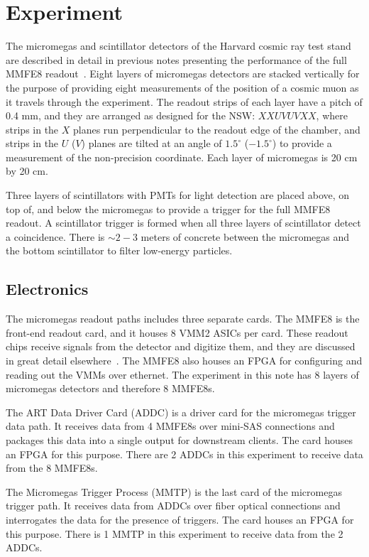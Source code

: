 \section{Experiment}
\label{sec:exp}

The micromegas and scintillator detectors of the Harvard cosmic ray test stand are described in detail in previous notes presenting the performance of the full MMFE8 readout~\cite{noisy,noiseless}. Eight layers of micromegas detectors are stacked vertically for the purpose of providing eight measurements of the position of a cosmic muon as it travels through the experiment. The readout strips of each layer have a pitch of 0.4 mm, and they are arranged as designed for the NSW: $XXUVUVXX$, where strips in the $X$ planes run perpendicular to the readout edge of the chamber, and strips in the $U$ ($V$) planes are tilted at an angle of $1.5^\circ$ ($-1.5^\circ$) to provide a measurement of the non-precision coordinate. Each layer of micromegas is 20 cm by 20 cm.

Three layers of scintillators with PMTs for light detection are placed above, on top of, and below the micromegas to provide a trigger for the full MMFE8 readout. A scintillator trigger is formed when all three layers of scintillator detect a coincidence. There is $\sim\!2\!-\!3$ meters of concrete between the micromegas and the bottom scintillator to filter low-energy particles.

\subsection{Electronics}
\label{sec:exp-elx}

The micromegas readout paths includes three separate cards. The MMFE8 is the front-end readout card, and it houses 8 VMM2 ASICs per card. These readout chips receive signals from the detector and digitize them, and they are discussed in great detail elsewhere~\cite{nswtdr,noisy,noiseless}. The MMFE8 also houses an FPGA for configuring and reading out the VMMs over ethernet. The experiment in this note has 8 layers of micromegas detectors and therefore 8 MMFE8s.

The ART Data Driver Card (ADDC) is a driver card for the micromegas trigger data path. It receives data from 4 MMFE8s over mini-SAS connections and packages this data into a single output for downstream clients. The card houses an FPGA for this purpose. There are 2 ADDCs in this experiment to receive data from the 8 MMFE8s.

The Micromegas Trigger Process (MMTP) is the last card of the micromegas trigger path. It receives data from ADDCs over fiber optical connections and interrogates the data for the presence of triggers. The card houses an FPGA for this purpose. There is 1 MMTP in this experiment to receive data from the 2 ADDCs.

